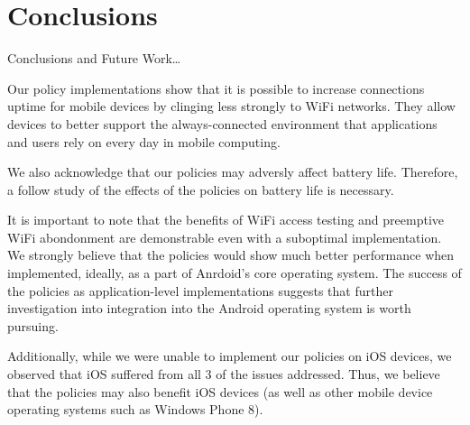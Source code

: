 \section{Conclusions}
\label{sec:conc}

Conclusions and Future Work\ldots

Our policy implementations show that it is possible to increase connections uptime for mobile devices by clinging less strongly to WiFi networks. They allow devices to better support the always-connected environment that applications and users rely on every day in mobile computing.

We also acknowledge that our policies may adversly affect battery life. Therefore, a follow study of the effects of the policies on battery life is necessary.

It is important to note that the benefits of WiFi access testing and preemptive WiFi abondonment are demonstrable even with a suboptimal implementation. We strongly believe that the policies would show much better performance when implemented, ideally, as a part of Anrdoid's core operating system. The success of the policies as application-level implementations suggests that further investigation into integration into the Android operating system is worth pursuing.

Additionally, while we were unable to implement our policies on iOS devices, we observed that iOS suffered from all 3 of the issues addressed. Thus, we believe that the policies may also benefit iOS devices (as well as other mobile device operating systems such as Windows Phone 8).
